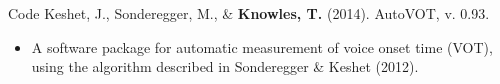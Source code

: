 \documentclass{resume} %
\begin{document}




\begin{rSection}{Code}
	Keshet, J., Sonderegger, M., \& {\bf Knowles, T.} (2014). AutoVOT, v. 0.93.
	\begin{itemize}
			\renewcommand\labelitemi{$\cdot$}
		\item A software package for automatic measurement of voice onset time (VOT), using the algorithm described in Sonderegger \& Keshet (2012).
	\end{itemize}
\end{rSection}



\end{document}
